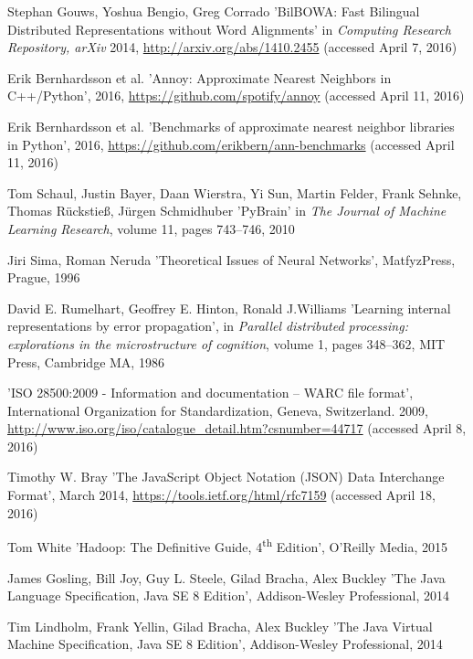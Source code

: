 \begin{thebibliography}{99}
Stephan Gouws, Yoshua Bengio, Greg Corrado
'BilBOWA: Fast Bilingual Distributed Representations without Word Alignments'
in \textit{Computing Research Repository, arXiv}
2014,
\url{http://arxiv.org/abs/1410.2455} (accessed April 7, 2016)

Erik Bernhardsson et al.
'Annoy: Approximate Nearest Neighbors in C++/Python',
2016,
\url{https://github.com/spotify/annoy} (accessed April 11, 2016)

Erik Bernhardsson et al.
'Benchmarks of approximate nearest neighbor libraries in Python',
2016,
\url{https://github.com/erikbern/ann-benchmarks} (accessed April 11, 2016)

Tom Schaul, Justin Bayer, Daan Wierstra, Yi Sun, Martin Felder, Frank Sehnke, Thomas Rückstieß, Jürgen Schmidhuber
'PyBrain'
in \textit{The Journal of Machine Learning Research},
volume 11,
pages 743--746,
2010

Jiri Sima, Roman Neruda
'Theoretical Issues of Neural Networks',
MatfyzPress, Prague, 
1996

David E. Rumelhart, Geoffrey E. Hinton, Ronald J.Williams
'Learning internal representations by error propagation',
in \textit{Parallel distributed processing: explorations in the microstructure of cognition},
volume 1,
pages 348--362,
MIT Press, Cambridge MA,
1986

'ISO 28500:2009 - Information and documentation -- WARC file format',
International Organization for Standardization, Geneva, Switzerland.
2009,
\url{http://www.iso.org/iso/catalogue_detail.htm?csnumber=44717} (accessed April 8, 2016)

Timothy W. Bray
'The JavaScript Object Notation (JSON) Data Interchange Format',
March 2014,
\url{https://tools.ietf.org/html/rfc7159} (accessed April 18, 2016)

Tom White
'Hadoop: The Definitive Guide, 4\textsuperscript{th} Edition',
O'Reilly Media,
2015

James Gosling, Bill Joy, Guy L. Steele, Gilad Bracha, Alex Buckley
'The Java Language Specification, Java SE 8 Edition',
Addison-Wesley Professional,
2014

Tim Lindholm, Frank Yellin, Gilad Bracha, Alex Buckley
'The Java Virtual Machine Specification, Java SE 8 Edition',
Addison-Wesley Professional,
2014


\end{thebibliography}
